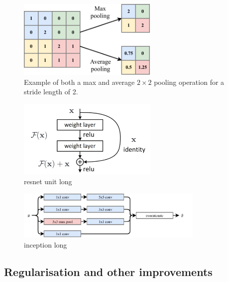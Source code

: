 \begin{figure} %
    \includegraphics[width=0.6\textwidth]{diagrams/7-cvn/pooling.pdf}
    \caption[Example of pooling operation.]
    {Example of both a max and average $2 \times 2$ pooling operation for a stride length of 2.}
    \label{fig:pooling}
\end{figure}

\begin{figure} %
    \includegraphics[width=0.6\textwidth]{diagrams/7-cvn/resnet_unit.png}
    \caption[resnet unit short]
    {resnet unit long}
    \label{fig:resnet_unit}
\end{figure}

\begin{figure} %
    \includegraphics[width=0.8\textwidth]{diagrams/7-cvn/inception.pdf}
    \caption[inception short]
    {inception long}
    \label{fig:se}
\end{figure}

\subsection{Regularisation and other improvements} %
\label{sec:cvn_theory_architectures} %

